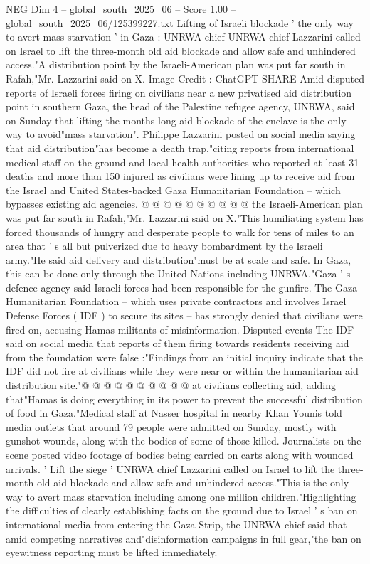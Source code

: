 \begin{textsample}{NEG Dim 4 – global\_south\_2025\_06 – Score 1.00 – global\_south\_2025\_06/125399227.txt}  \label{ex:f4_neg_108}
Lifting of Israeli blockade ' the only way to avert mass starvation ' in Gaza : UNRWA chief UNRWA chief Lazzarini called on Israel to lift the three-month old aid blockade and allow safe and unhindered access."A distribution point by the Israeli-American plan was put far south in Rafah,"Mr.
Lazzarini said on X.
Image Credit : ChatGPT SHARE Amid disputed reports of Israeli forces firing on civilians near a new privatised aid distribution point in southern Gaza, the head of the Palestine refugee agency, UNRWA, said on Sunday that lifting the months-long aid blockade of the enclave is the only way to avoid"mass starvation".
Philippe Lazzarini posted on social media saying that aid distribution"has become a death trap,"citing reports from international medical staff on the ground and local health authorities who reported at least 31 deaths and more than 150 injured as civilians were lining up to receive aid from the Israel and United States-backed Gaza Humanitarian Foundation -- which bypasses existing aid agencies. @ @ @ @ @ @ @ @ @ @ the Israeli-American plan was put far south in Rafah,"Mr.
Lazzarini said on X."This humiliating system has forced thousands of hungry and desperate people to walk for tens of miles to an area that ' s all but pulverized due to heavy bombardment by the Israeli army."He said aid delivery and distribution"must be at scale and safe.
In Gaza, this can be done only through the United Nations including UNRWA."Gaza ' s defence agency said Israeli forces had been responsible for the gunfire.
The Gaza Humanitarian Foundation -- which uses private contractors and involves Israel Defense Forces ( IDF ) to secure its sites -- has strongly denied that civilians were fired on, accusing Hamas militants of misinformation.
Disputed events The IDF said on social media that reports of them firing towards residents receiving aid from the foundation were false :"Findings from an initial inquiry indicate that the IDF did not fire at civilians while they were near or within the humanitarian aid distribution site."@ @ @ @ @ @ @ @ @ @ at civilians collecting aid, adding that"Hamas is doing everything in its power to prevent the successful distribution of food in Gaza."Medical staff at Nasser hospital in nearby Khan Younis told media outlets that around 79 people were admitted on Sunday, mostly with gunshot wounds, along with the bodies of some of those killed.
Journalists on the scene posted video footage of bodies being carried on carts along with wounded arrivals. ' Lift the siege ' UNRWA chief Lazzarini called on Israel to lift the three-month old aid blockade and allow safe and unhindered access."This is the only way to avert mass starvation including among one million children."Highlighting the difficulties of clearly establishing facts on the ground due to Israel ' s ban on international media from entering the Gaza Strip, the UNRWA chief said that amid competing narratives and"disinformation campaigns in full gear,"the ban on eyewitness reporting must be lifted immediately.

\end{textsample}
